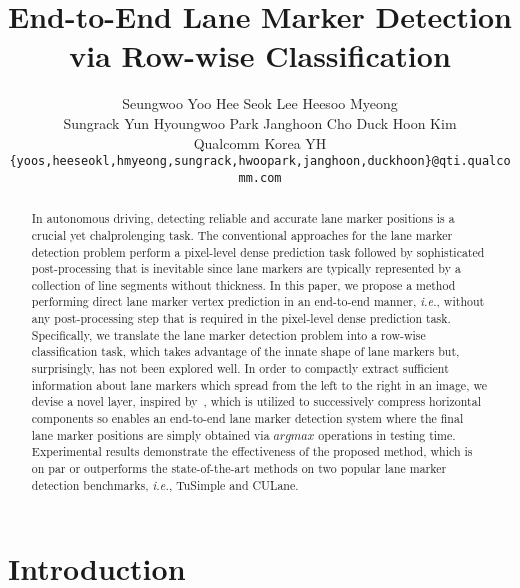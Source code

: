 \documentclass[10pt,twocolumn,letterpaper]{article}
\begin{document}
\title{End-to-End Lane Marker Detection via Row-wise Classification}



\author{Seungwoo Yoo \quad Hee Seok Lee \quad Heesoo Myeong \\ \vspace{3.px} \quad Sungrack Yun \quad Hyoungwoo Park \quad Janghoon Cho \quad Duck Hoon Kim \vspace{3mm} \\
Qualcomm Korea YH\\
{\tt\small \{yoos,heeseokl,hmyeong,sungrack,hwoopark,janghoon,duckhoon\}@qti.qualcomm.com}
}

\maketitle


\def\algorithmname{E2E-LMD}

\begin{abstract}
In autonomous driving, detecting reliable and accurate lane marker positions is a crucial yet chalprolenging task. The conventional approaches for the lane marker detection problem perform a pixel-level dense prediction task followed by sophisticated post-processing that is inevitable since lane markers are typically represented by a collection of line segments without thickness. In this paper, we propose a method performing direct lane marker vertex prediction in an end-to-end manner, \textit{i.e.}, without any post-processing step that is required in the pixel-level dense prediction task. Specifically, we translate the lane marker detection problem into a row-wise classification task, which takes advantage of the innate shape of lane markers but, surprisingly, has not been explored well. In order to compactly extract sufficient information about lane markers which spread from the left to the right in an image, we devise a novel layer, inspired by~\cite{Drivable}, which is utilized to successively compress horizontal components so enables an end-to-end lane marker detection system where the final lane marker positions are simply obtained via $\textit{argmax}$ operations in testing time. Experimental results demonstrate the effectiveness of the proposed method, which is on par or outperforms the state-of-the-art methods on two popular lane marker detection benchmarks, \textit{i.e.}, TuSimple and CULane.
\end{abstract}

\section{Introduction}
\end{document}
